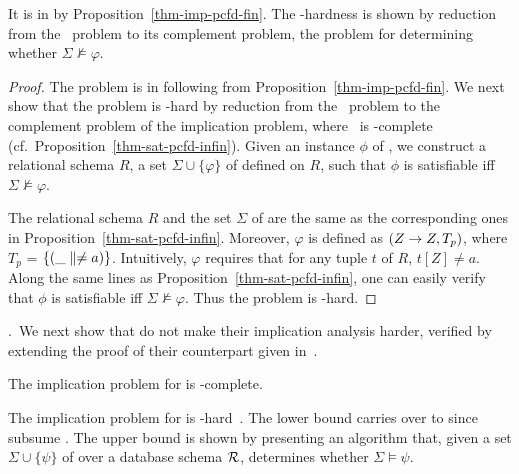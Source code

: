 \proofs It is in \coNP by
Proposition~\ref{thm-imp-pcfd-fin}. The \coNP-hardness is shown
by reduction from the \kSAT\ problem to its complement problem, \ie
the problem for determining whether $\Sigma\not\models\varphi$.
\eop

\begin{proof}
The problem is in \coNP following from
Proposition~\ref{thm-imp-pcfd-fin}. We next show that the problem is
\coNP-hard by reduction from the \kSAT\ problem to the complement
problem of the implication problem, where \kSAT\ is \NP-complete
(cf.~Proposition~\ref{thm-sat-pcfd-infin}). Given an instance $\phi$
of \kSAT, we construct a relational schema $R$, a set
$\Sigma\cup\{\varphi\}$ of \pCFDs defined on $R$, such that $\phi$
is satisfiable iff $\Sigma\not\models\varphi$.


The relational schema $R$ and the set $\Sigma$ of \pCFDs are the same
as the corresponding ones in Proposition~\ref{thm-sat-pcfd-infin}.
Moreover, $\varphi$ is defined as $(Z \rightarrow Z, T_p)$, where $T_{p}$ =
$\{(\_ \parallel \ne a)\}$. Intuitively, $\varphi$ requires that for any
tuple $t$ of $R$, $t[Z] \ne a$. Along the same lines as
Proposition~\ref{thm-sat-pcfd-infin}, one can easily verify that
$\phi$ is satisfiable iff $\Sigma\not\models\varphi$. Thus the
problem is \coNP-hard. 
\end{proof}




.~We next show that \pCINDs
do not make their implication analysis harder, verified by extending the proof of
their \CINDs counterpart given in~\cite{CINDs}.

\begin{prop}
\label{thm-imp-pcind-fin}The implication problem for \pCINDs is
\EXPTIME-complete. \eop
\end{prop}
\vspace{-1ex}

\proofs The implication problem for \CINDs is
\EXPTIME-hard~\cite{CINDs}. The lower bound carries over to \pCINDs
since \pCINDs subsume \CINDs. The \EXPTIME upper bound is shown
by presenting an \EXPTIME algorithm that, given a set
$\Sigma\cup\{\psi\}$ of \pCINDs over a database schema $\cal R$,
determines whether $\Sigma\models\psi$. \eop

